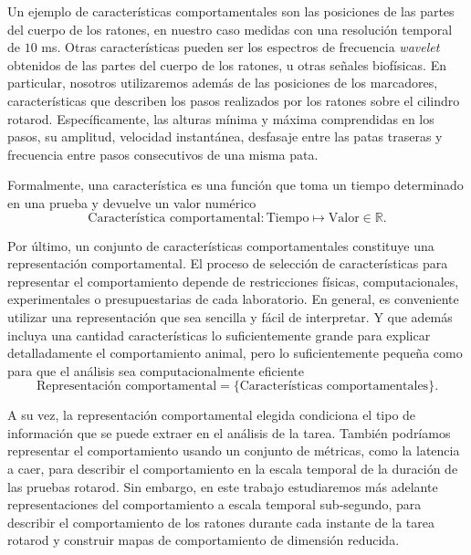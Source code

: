 Un ejemplo de características comportamentales son las posiciones de las partes del cuerpo de los ratones, en nuestro caso medidas con una resolución temporal de $10$ ms. Otras características pueden ser los espectros de frecuencia \textit{wavelet} obtenidos de las partes del cuerpo de los ratones, u otras señales biofísicas. En particular, nosotros utilizaremos además de las posiciones de los marcadores, características que describen los pasos realizados por los ratones sobre el cilindro rotarod. Específicamente, las alturas mínima y máxima comprendidas en los pasos, su amplitud, velocidad instantánea, desfasaje entre las patas traseras y frecuencia entre pasos consecutivos de una misma pata.

Formalmente, una característica es una función que toma un tiempo determinado en una prueba y devuelve un valor numérico
\begin{equation*}
    \text{Característica comportamental}: \text{Tiempo} \mapsto \text{Valor} \in \mathbb{R}.
\end{equation*}

Por último, un conjunto de características comportamentales constituye una representación comportamental. El proceso de selección de características para representar el comportamiento depende de restricciones físicas, computacionales, experimentales o presupuestarias de cada laboratorio. En general, es conveniente utilizar una representación que sea sencilla y fácil de interpretar. Y que además incluya una cantidad características lo suficientemente grande para explicar detalladamente el comportamiento animal, pero lo suficientemente pequeña como para que el análisis sea computacionalmente eficiente
\begin{equation*}
    \text{Representación comportamental} = \{\text{Características comportamentales}\}.
\end{equation*}

A su vez, la representación comportamental elegida condiciona el tipo de información que se puede extraer en el análisis de la tarea. También podríamos representar el comportamiento usando un conjunto de métricas, como la latencia a caer, para describir el comportamiento en la escala temporal de la duración de las pruebas rotarod. Sin embargo, en este trabajo estudiaremos más adelante representaciones del comportamiento a escala temporal sub-segundo, para describir el comportamiento de los ratones durante cada instante de la tarea rotarod y construir mapas de comportamiento de dimensión reducida.

